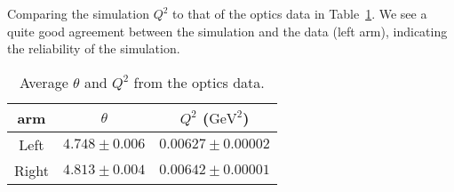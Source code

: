 \begin{comment}
I am doubting if I was comparing the same thing. 
In data, $Q^2$ was calculated as:
$$ Q^2 = 2*beamE*P*(1-\cos(\theta))$$
where beamE was the average beam energy (before hitting the target), 
and P was the reconstructed beam energy, or post-target energy 
and $\theta$ was the reconstructed scattering angle 

But in simulation, $Q^2$ was calculated as:
$$ Q^2 = 2*E*Ef*(1-\cos(\theta)) $$
where E was the post vertex beam energy: I made a mistake here, E should be 
pre-vertex beam energy.
$$ Ef = M*E/(M + E*(1-cos(th))) $$
was the theorectical beam energy after elastic scattering and $\theta$ was 
the scattering angle.

Obviously, data and simulation had different definitions:
$$ beamE > E	\quad P < E	\quad P \stacker{?}{\sim} $$
The only good news was that beamE, E, P, Ef were all close to each other. Overall,
the simulation would make the simulation $Q^2$ smaller than that of data. Not
sure how large the uncertainty was.

The only difference here for vertex and post-vertex was the scattering angle,
one was the vertex angle and the other being the post-target scattering angle.

The CREX analysis was comparing the same thing.
\end{comment}

Comparing the simulation $Q^2$ to that of the optics data in Table~\ref{tab:prex_C_contam_Q2}. 
We see a quite good agreement between the simulation and the data (left arm),
indicating the reliability of the simulation.
\begin{table}
    \centering
    \begin{tabular}{c | c c}
	\hline
	arm & $\theta$	& $Q^2$ ($\mathrm{GeV}^2$)   \\
	\hline
	Left	& $4.748 \pm 0.006$ & $0.00627 \pm 0.00002$	\\
	Right	& $4.813 \pm 0.004$ & $0.00642 \pm 0.00001$	\\
	\hline
    \end{tabular}
    \caption{Average $\theta$ and $Q^2$ from the optics data.
    }
    \label{tab:prex_C_contam_Q2}
\end{table}

